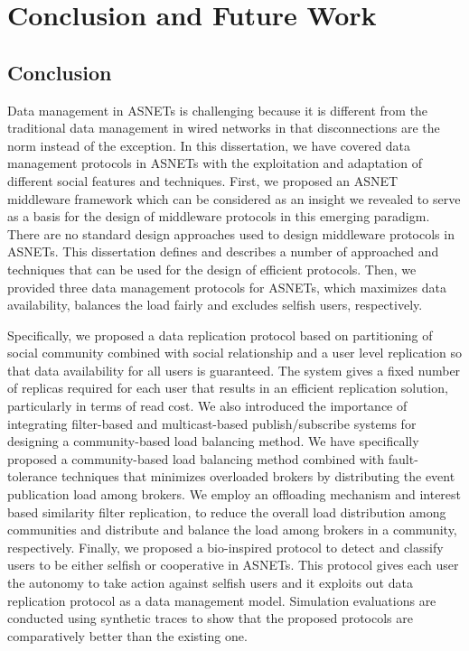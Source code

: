 \chapter{Conclusion and Future Work}\label{Chap7}

\section{Conclusion}\label{Chap7_01}
Data management in ASNETs is challenging because it is different from the traditional data management in wired networks in that disconnections are the norm instead of the exception. In this dissertation, we have covered data management protocols in ASNETs with the exploitation and adaptation of different social features and techniques. First, we proposed an ASNET middleware framework which can be considered as an insight we revealed to serve as a basis for the design of middleware protocols in this emerging paradigm. There are no standard design approaches used to design middleware protocols in ASNETs. This dissertation defines and describes a number of approached and techniques that can be used for the design of efficient protocols. Then, we provided three data management protocols for ASNETs, which maximizes data availability, balances the load fairly and excludes selfish users, respectively.

Specifically, we proposed a data replication protocol based on partitioning of social community combined with social relationship and a user level replication so that data availability for all users is guaranteed. The system gives a fixed number of replicas required for each user that results in an efficient replication solution, particularly in terms of read cost. We also introduced the importance of integrating filter-based and multicast-based publish/subscribe systems for designing a community-based load balancing method. We have specifically proposed a community-based load balancing method combined with fault-tolerance techniques that minimizes overloaded brokers by distributing the event publication load among brokers. We employ an offloading mechanism and interest based similarity filter replication, to reduce the overall load distribution among communities and distribute and balance the load among brokers in a community, respectively. Finally, we proposed a bio-inspired protocol to detect and classify users to be either selfish or cooperative in ASNETs. This protocol gives each user the autonomy to take action against selfish users and it exploits out data replication protocol as a data management model. Simulation evaluations are conducted using synthetic traces to show that the proposed protocols are comparatively better than the existing one.

